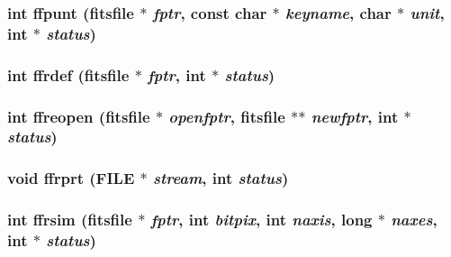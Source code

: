 \subsubsection{\setlength{\rightskip}{0pt plus 5cm}int ffpunt (\bf{fitsfile} $\ast$ {\em fptr}, const char $\ast$ {\em keyname}, char $\ast$ {\em unit}, int $\ast$ {\em status})}\label{test_2shm__client_2fitsio_8h_67dc8b0a8bbcf6abbd2b529763a4ea17}


\subsubsection{\setlength{\rightskip}{0pt plus 5cm}int ffrdef (\bf{fitsfile} $\ast$ {\em fptr}, int $\ast$ {\em status})}\label{test_2shm__client_2fitsio_8h_4b27e85305907801c1c6161bee2bd45e}


\subsubsection{\setlength{\rightskip}{0pt plus 5cm}int ffreopen (\bf{fitsfile} $\ast$ {\em openfptr}, \bf{fitsfile} $\ast$$\ast$ {\em newfptr}, int $\ast$ {\em status})}\label{test_2shm__client_2fitsio_8h_0f52024e2521bf029d2bf87a365e9e39}


\subsubsection{\setlength{\rightskip}{0pt plus 5cm}void ffrprt (FILE $\ast$ {\em stream}, int {\em status})}\label{test_2shm__client_2fitsio_8h_ddc25a8219909329a0d3aed010d854ee}


\subsubsection{\setlength{\rightskip}{0pt plus 5cm}int ffrsim (\bf{fitsfile} $\ast$ {\em fptr}, int {\em bitpix}, int {\em naxis}, long $\ast$ {\em naxes}, int $\ast$ {\em status})}\label{test_2shm__client_2fitsio_8h_41eea6b73ae062d053678b27edcdb3ce}


